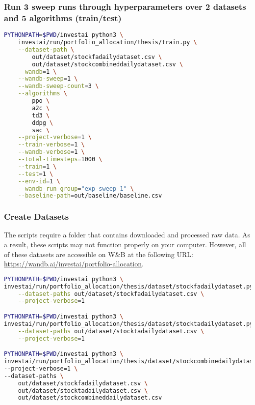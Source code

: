 \documentclass[../xlapes02]{subfiles}
\begin{document}
    \subsubsection{Run 3 sweep runs through hyperparameters over 2 datasets and 5 algorithms (train/test)}
    \begin{lstlisting}[language=bash]
PYTHONPATH=$PWD/investai python3 \
    investai/run/portfolio_allocation/thesis/train.py \
    --dataset-path \
        out/dataset/stockfadailydataset.csv \
        out/dataset/stockcombineddailydataset.csv \
    --wandb=1 \
    --wandb-sweep=1 \
    --wandb-sweep-count=3 \
    --algorithms \
        ppo \
        a2c \
        td3 \
        ddpg \
        sac \
    --project-verbose=1 \
    --train-verbose=1 \
    --wandb-verbose=1 \
    --total-timesteps=1000 \
    --train=1 \
    --test=1 \
    --env-id=1 \
    --wandb-run-group="exp-sweep-1" \
    --baseline-path=out/baseline/baseline.csv
    \end{lstlisting}

    \subsubsection{Create Datasets}
    The scripts require a folder that contains downloaded and processed raw data. As a result, these scripts may not function properly on your computer. However, all of these datasets are accessible on W\&B at the following URL: \url{https://wandb.ai/investai/portfolio-allocation}.
    \begin{lstlisting}[language=bash]
PYTHONPATH=$PWD/investai python3 \
investai/run/portfolio_allocation/thesis/dataset/stockfadailydataset.py \
    --dataset-paths out/dataset/stockfadailydataset.csv \
    --project-verbose=1

PYTHONPATH=$PWD/investai python3 \
investai/run/portfolio_allocation/thesis/dataset/stocktadailydataset.py \
    --dataset-paths out/dataset/stocktadailydataset.csv \
    --project-verbose=1

PYTHONPATH=$PWD/investai python3 \
investai/run/portfolio_allocation/thesis/dataset/stockcombinedailydataset.py \
--project-verbose=1 \
--dataset-paths \
    out/dataset/stockfadailydataset.csv \
    out/dataset/stocktadailydataset.csv \
    out/dataset/stockcombineddailydataset.csv
    \end{lstlisting}
\end{document}
